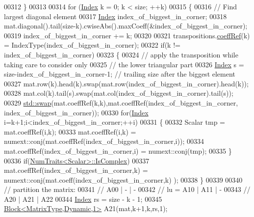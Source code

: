 \begin{DoxyCode}
00312     \}
00313 
00314     \textcolor{keywordflow}{for} (\hyperlink{group___cholesky___module_ad9c57eb2fb3bbccd51b9d2e111bea355}{Index} k = 0; k < size; ++k)
00315     \{
00316       \textcolor{comment}{// Find largest diagonal element}
00317       \hyperlink{group___cholesky___module_ad9c57eb2fb3bbccd51b9d2e111bea355}{Index} index\_of\_biggest\_in\_corner;
00318       mat.diagonal().tail(size-k).cwiseAbs().maxCoeff(&index\_of\_biggest\_in\_corner);
00319       index\_of\_biggest\_in\_corner += k;
00320 
00321       transpositions.\hyperlink{class_eigen_1_1_transpositions_base_a97dda1bb4ff8bdd83d8e97af3e590252}{coeffRef}(k) = IndexType(index\_of\_biggest\_in\_corner);
00322       \textcolor{keywordflow}{if}(k != index\_of\_biggest\_in\_corner)
00323       \{
00324         \textcolor{comment}{// apply the transposition while taking care to consider only}
00325         \textcolor{comment}{// the lower triangular part}
00326         \hyperlink{group___cholesky___module_ad9c57eb2fb3bbccd51b9d2e111bea355}{Index} s = size-index\_of\_biggest\_in\_corner-1; \textcolor{comment}{// trailing size after the biggest element}
00327         mat.row(k).head(k).swap(mat.row(index\_of\_biggest\_in\_corner).head(k));
00328         mat.col(k).tail(s).swap(mat.col(index\_of\_biggest\_in\_corner).tail(s));
00329         \hyperlink{endian_8c_a3ca5ecd34b04d6a243c054ac3a57f68d}{std::swap}(mat.coeffRef(k,k),mat.coeffRef(index\_of\_biggest\_in\_corner,
      index\_of\_biggest\_in\_corner));
00330         \textcolor{keywordflow}{for}(\hyperlink{group___cholesky___module_ad9c57eb2fb3bbccd51b9d2e111bea355}{Index} i=k+1;i<index\_of\_biggest\_in\_corner;++i)
00331         \{
00332           Scalar tmp = mat.coeffRef(i,k);
00333           mat.coeffRef(i,k) = numext::conj(mat.coeffRef(index\_of\_biggest\_in\_corner,i));
00334           mat.coeffRef(index\_of\_biggest\_in\_corner,i) = numext::conj(tmp);
00335         \}
00336         \textcolor{keywordflow}{if}(\hyperlink{group___core___module_struct_eigen_1_1_num_traits}{NumTraits<Scalar>::IsComplex})
00337           mat.coeffRef(index\_of\_biggest\_in\_corner,k) = numext::conj(mat.coeff(index\_of\_biggest\_in\_corner,k)
      );
00338       \}
00339 
00340       \textcolor{comment}{// partition the matrix:}
00341       \textcolor{comment}{//       A00 |  -  |  -}
00342       \textcolor{comment}{// lu  = A10 | A11 |  -}
00343       \textcolor{comment}{//       A20 | A21 | A22}
00344       \hyperlink{group___cholesky___module_ad9c57eb2fb3bbccd51b9d2e111bea355}{Index} rs = size - k - 1;
00345       \hyperlink{group___core___module_class_eigen_1_1_block}{Block<MatrixType,Dynamic,1>} A21(mat,k+1,k,rs,1);

\end{DoxyCode}
